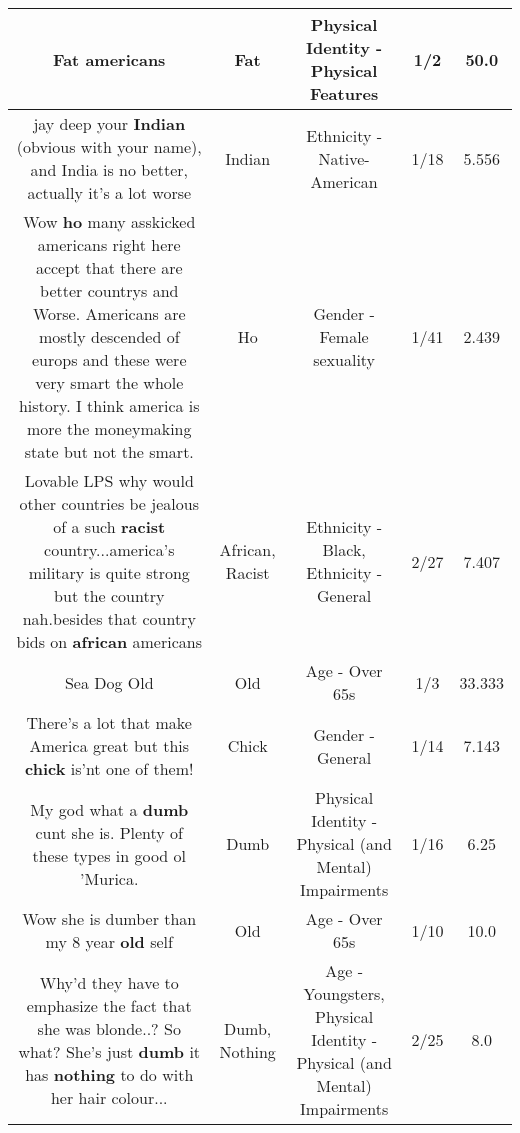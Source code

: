 \documentclass[11pt]{article}
\newlength\mylength
\begin{document}
\begin{center}
\begin{longtable}{|C{.65\mylength}|C{.30\mylength}|C{.12\mylength}|C{.12\mylength}|C{.12\mylength}|}
  \small Fat americans\normalsize   & Fat & Physical Identity - Physical Features & 1/2 & 50.0 \\  \hline
  \small jay deep your \textbf{Indian} (obvious with your name), and India is no better, actually it's a lot worse\normalsize   & Indian & Ethnicity - Native-American & 1/18 & 5.556 \\  \hline
  \small Wow \textbf{ho} many asskicked americans right here accept that there are better countrys and Worse. Americans are mostly descended of europs and these were very smart the whole history. I think america is more the moneymaking state but not the smart.\normalsize   & Ho & Gender - Female sexuality & 1/41 & 2.439 \\  \hline
  \small Lovable LPS why would other countries be jealous of a such \textbf{racist} country...america's military is quite strong but the country nah.besides that country bids on \textbf{african} americans\normalsize   & African, Racist & Ethnicity - Black, Ethnicity - General & 2/27 & 7.407 \\  \hline
  \small Sea Dog Old\normalsize   & Old & Age - Over 65s & 1/3 & 33.333 \\  \hline
  \small There's a lot that make America great but this \textbf{chick} is'nt one of them!\normalsize   & Chick & Gender - General & 1/14 & 7.143 \\  \hline
  \small My god what a \textbf{dumb} cunt she is. Plenty of these types in good ol 'Murica.\normalsize   & Dumb & Physical Identity - Physical (and Mental) Impairments & 1/16 & 6.25 \\  \hline
  \small Wow she is dumber than my 8 year \textbf{old} self\normalsize   & Old & Age - Over 65s & 1/10 & 10.0 \\  \hline
  \small Why'd they have to emphasize the fact that she was blonde..? So what? She's just \textbf{dumb} it has \textbf{nothing} to do with her hair colour...\normalsize   & Dumb, Nothing & Age - Youngsters, Physical Identity - Physical (and Mental) Impairments & 2/25 & 8.0 \\  \hline

\end{longtable}
\end{center}
\end{document}
